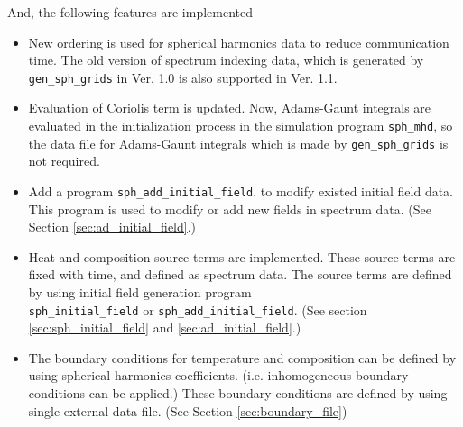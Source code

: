 And, the following features are implemented
\begin{itemize}
\item New ordering is used for spherical harmonics data to reduce communication time. The old version of spectrum indexing data, which is generated by \verb|gen_sph_grids| in Ver. 1.0 is also supported in Ver. 1.1.
\item Evaluation of Coriolis term is updated. Now, Adams-Gaunt integrals are evaluated in the initialization process in the simulation program \verb|sph_mhd|, so the data file for Adams-Gaunt integrals which is made by \verb|gen_sph_grids|  is not required.
\item Add a program \verb|sph_add_initial_field|. to modify existed initial field data. This program is used to modify or add new fields in spectrum data. (See Section \ref{sec:ad_initial_field}.)
\item Heat and composition source terms are implemented. These source terms are fixed with time, and defined as spectrum data. The source terms are defined by using initial field generation program \\ \verb|sph_initial_field| or \verb|sph_add_initial_field|. (See section \ref{sec:sph_initial_field} and  \ref{sec:ad_initial_field}.)
\item The boundary conditions for temperature and composition can be defined by using spherical harmonics coefficients. (i.e. inhomogeneous boundary conditions can be applied.) These boundary conditions are defined by using single external data file. (See Section \ref{sec:boundary_file})
\end{itemize}

%
